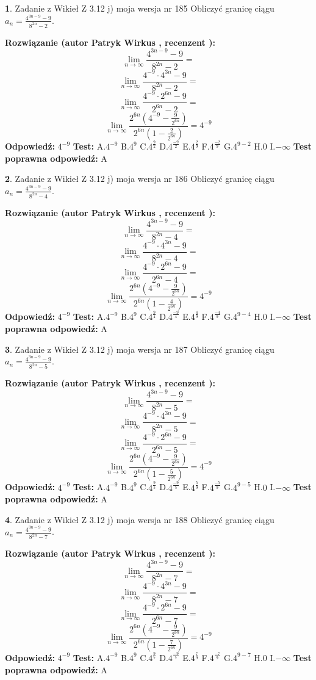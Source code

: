 \documentclass[12pt, a4paper]{article}
\theoremstyle{definition} %
\newtheorem{zad}{}
\newcommand{\zadStart}[1]{\begin{zad}#1\newline}
\newcommand{\zadStop}{\end{zad}}
\newcommand{\rozwStart}[2]{\noindent \textbf{Rozwiązanie (autor #1 , recenzent #2): }\newline}
\newcommand{\rozwStop}{\newline}
\newcommand{\odpStart}{\noindent \textbf{Odpowiedź:}\newline}
\newcommand{\odpStop}{\newline}
\newcommand{\testStart}{\noindent \textbf{Test:}\newline}
\newcommand{\testStop}{\newline}
\newcommand{\kluczStart}{\noindent \textbf{Test poprawna odpowiedź:}\newline}
\newcommand{\kluczStop}{\newline}
\begin{document}
\zadStart{Zadanie z Wikieł Z 3.12 j) moja wersja nr 185}
Obliczyć granicę ciągu $a_{n}=\frac{4^{3n-9}-9}{8^{2n}-2}$.
\zadStop
\rozwStart{Patryk Wirkus}{}
$$\lim\limits_{n\to\infty}\frac{4^{3n-9}-9}{8^{2n}-2}=$$
$$\lim\limits_{n\to\infty}\frac{4^{-9} \cdot 4^{3n}-9}{8^{2n}-2}=$$
$$\lim\limits_{n\to\infty}\frac{4^{-9} \cdot 2^{6n}-9}{2^{6n}-2}=$$
$$\lim\limits_{n\to\infty}\frac{2^{6n}(4^{-9} - \frac{9}{2^{6n}})}{2^{6n}(1-\frac{2}{2^{6n}})}= 4^{-9}$$
\rozwStop
\odpStart
$4^{-9}$
\odpStop
\testStart
A.$4^{-9}$
B.$4^{9}$
C.$4^{\frac{9}{2}}$
D.$4^{\frac{-9}{2}}$
E.$4^{\frac{2}{9}}$
F.$4^{\frac{-2}{9}}$
G.$4^{9-2}$
H.$0$
I.$-\infty$
\testStop
\kluczStart
A
\kluczStop



\zadStart{Zadanie z Wikieł Z 3.12 j) moja wersja nr 186}
Obliczyć granicę ciągu $a_{n}=\frac{4^{3n-9}-9}{8^{2n}-4}$.
\zadStop
\rozwStart{Patryk Wirkus}{}
$$\lim\limits_{n\to\infty}\frac{4^{3n-9}-9}{8^{2n}-4}=$$
$$\lim\limits_{n\to\infty}\frac{4^{-9} \cdot 4^{3n}-9}{8^{2n}-4}=$$
$$\lim\limits_{n\to\infty}\frac{4^{-9} \cdot 2^{6n}-9}{2^{6n}-4}=$$
$$\lim\limits_{n\to\infty}\frac{2^{6n}(4^{-9} - \frac{9}{2^{6n}})}{2^{6n}(1-\frac{4}{2^{6n}})}= 4^{-9}$$
\rozwStop
\odpStart
$4^{-9}$
\odpStop
\testStart
A.$4^{-9}$
B.$4^{9}$
C.$4^{\frac{9}{4}}$
D.$4^{\frac{-9}{4}}$
E.$4^{\frac{4}{9}}$
F.$4^{\frac{-4}{9}}$
G.$4^{9-4}$
H.$0$
I.$-\infty$
\testStop
\kluczStart
A
\kluczStop



\zadStart{Zadanie z Wikieł Z 3.12 j) moja wersja nr 187}
Obliczyć granicę ciągu $a_{n}=\frac{4^{3n-9}-9}{8^{2n}-5}$.
\zadStop
\rozwStart{Patryk Wirkus}{}
$$\lim\limits_{n\to\infty}\frac{4^{3n-9}-9}{8^{2n}-5}=$$
$$\lim\limits_{n\to\infty}\frac{4^{-9} \cdot 4^{3n}-9}{8^{2n}-5}=$$
$$\lim\limits_{n\to\infty}\frac{4^{-9} \cdot 2^{6n}-9}{2^{6n}-5}=$$
$$\lim\limits_{n\to\infty}\frac{2^{6n}(4^{-9} - \frac{9}{2^{6n}})}{2^{6n}(1-\frac{5}{2^{6n}})}= 4^{-9}$$
\rozwStop
\odpStart
$4^{-9}$
\odpStop
\testStart
A.$4^{-9}$
B.$4^{9}$
C.$4^{\frac{9}{5}}$
D.$4^{\frac{-9}{5}}$
E.$4^{\frac{5}{9}}$
F.$4^{\frac{-5}{9}}$
G.$4^{9-5}$
H.$0$
I.$-\infty$
\testStop
\kluczStart
A
\kluczStop



\zadStart{Zadanie z Wikieł Z 3.12 j) moja wersja nr 188}
Obliczyć granicę ciągu $a_{n}=\frac{4^{3n-9}-9}{8^{2n}-7}$.
\zadStop
\rozwStart{Patryk Wirkus}{}
$$\lim\limits_{n\to\infty}\frac{4^{3n-9}-9}{8^{2n}-7}=$$
$$\lim\limits_{n\to\infty}\frac{4^{-9} \cdot 4^{3n}-9}{8^{2n}-7}=$$
$$\lim\limits_{n\to\infty}\frac{4^{-9} \cdot 2^{6n}-9}{2^{6n}-7}=$$
$$\lim\limits_{n\to\infty}\frac{2^{6n}(4^{-9} - \frac{9}{2^{6n}})}{2^{6n}(1-\frac{7}{2^{6n}})}= 4^{-9}$$
\rozwStop
\odpStart
$4^{-9}$
\odpStop
\testStart
A.$4^{-9}$
B.$4^{9}$
C.$4^{\frac{9}{7}}$
D.$4^{\frac{-9}{7}}$
E.$4^{\frac{7}{9}}$
F.$4^{\frac{-7}{9}}$
G.$4^{9-7}$
H.$0$
I.$-\infty$
\testStop
\kluczStart
A
\kluczStop
\end{document}
